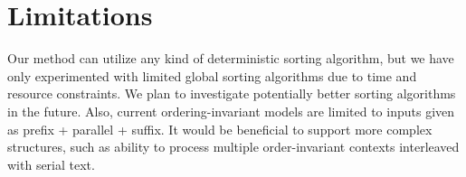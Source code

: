 \clearpage
\newpage
\section{Limitations}
Our method can utilize any kind of deterministic sorting algorithm, but we have only experimented with limited global sorting algorithms due to time and resource constraints. We plan to investigate potentially better sorting algorithms in the future.
Also, current ordering-invariant models are limited to inputs given as prefix + parallel + suffix. It would be beneficial to support more complex structures, such as ability to process multiple order-invariant contexts interleaved with serial text.

